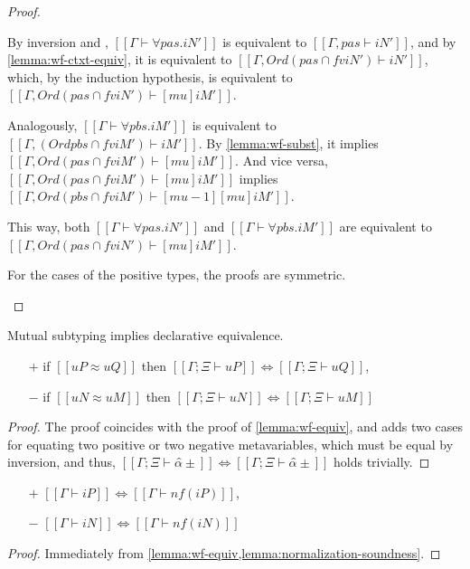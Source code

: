 \begin{proof}
\begin{caseof}
      By inversion and ,
      $[[Γ ⊢ ∀pas.iN']]$ is equivalent to $[[Γ, pas ⊢ iN']]$,
      and by \cref{lemma:wf-ctxt-equiv}, it is equivalent to 
      $[[Γ, Ord ({pas} ∩ fv iN') ⊢ iN']]$,
      which, by the induction hypothesis, is equivalent to
      $[[Γ, Ord ({pas} ∩ fv iN') ⊢ [mu]iM']]$.

      Analogously, $[[Γ ⊢ ∀pbs.iM']]$ is equivalent to
      $[[Γ, (Ord {pbs} ∩ fv iM') ⊢ iM']]$.
      By \cref{lemma:wf-subst}, it implies 
      $[[Γ, Ord ({pas} ∩ fv iM') ⊢ [mu]iM']]$. And vice versa, 
      $[[Γ, Ord ({pas} ∩ fv iM') ⊢ [mu]iM']]$ implies  
      $[[Γ, Ord ({pbs} ∩ fv iM') ⊢ [mu-1][mu]iM']]$.
 
      This way, both $[[Γ ⊢ ∀pas.iN']]$ and $[[Γ ⊢ ∀pbs.iM']]$ are equivalent to
      $[[Γ, Ord ({pas} ∩ fv iN') ⊢ [mu]iM']]$. 
    \item For the cases of the positive types, the proofs are symmetric.
  \end{caseof}
\end{proof}

\begin{lemma}
  \label{lemma:wf-equiv-algo}
  Mutual subtyping implies declarative equivalence.
  \begin{itemize}
  \item[$+$] if $[[uP ≈ uQ]]$ then $[[Γ; Ξ ⊢ uP]] \iff [[Γ; Ξ ⊢ uQ]]$,
  \item[$-$] if $[[uN ≈ uM]]$ then $[[Γ; Ξ ⊢ uN]] \iff [[Γ; Ξ ⊢ uM]]$
  \end{itemize}
\end{lemma}
\begin{proof}
  The proof coincides with the proof of \cref{lemma:wf-equiv},
  and adds two cases for equating two positive or two negative metavariables,
  which must be equal by inversion, and thus, 
  $[[Γ; Ξ ⊢ α̂±]] \iff [[Γ; Ξ  ⊢ α̂±]]$ holds trivially.
\end{proof}

\begin{corollary}
  \label{corollary:wf-nf}
  \hfill
  \begin{itemize}
  \item[$+$] $[[Γ ⊢ iP]] \iff [[Γ ⊢ nf(iP)]]$,
  \item[$-$] $[[Γ ⊢ iN]] \iff [[Γ ⊢ nf(iN)]]$
  \end{itemize}
\end{corollary}
\begin{proof}
  Immediately from \cref{lemma:wf-equiv,lemma:normalization-soundness}.
\end{proof}

